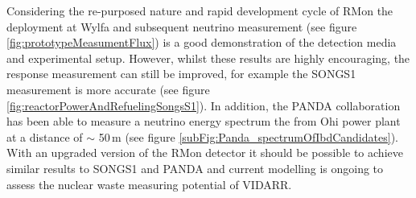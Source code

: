 Considering the re-purposed nature and rapid development cycle of RMon the deployment at Wylfa and subsequent neutrino measurement (see figure \ref{fig:prototypeMeasumentFlux}) is a good demonstration of the detection media and experimental setup. However, whilst these results are highly encouraging, the response measurement can still be improved, for example the SONGS1 measurement is more accurate (see figure \ref{fig:reactorPowerAndRefuelingSongsS1}). In addition, the PANDA collaboration has been able to measure a neutrino energy spectrum the from Ohi power plant at a distance of $\sim$ 50\,m \cite{IIRIE_Panda_2021} (see figure \ref{subFig:Panda_spectrumOfIbdCandidates}). With an upgraded version of the RMon detector it should be possible to achieve similar results to SONGS1 and PANDA and current modelling is ongoing to assess the nuclear waste measuring potential of VIDARR. 


